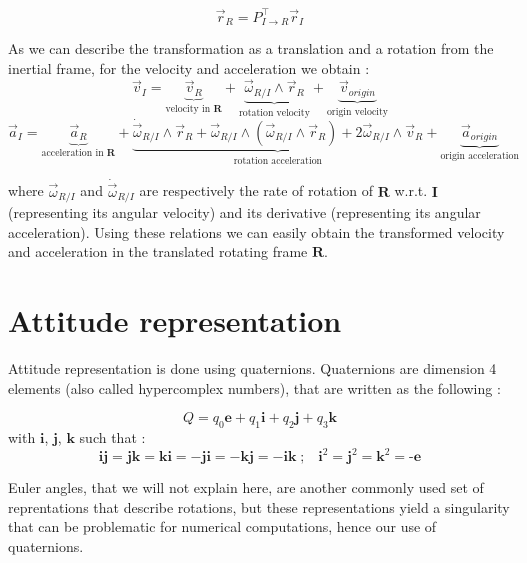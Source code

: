 \documentclass{article}
\begin{document}
\begin{equation}
\vec{r}_R = P^\top_{I \rightarrow R}\vec{r}_I
\end{equation}

As we can describe the transformation as a translation and a rotation from the inertial frame, for the velocity and acceleration we obtain \cite{book:911134}: \\

\begin{equation}
  \vec{v}_I = \underbrace{\vec{v}_R}_{\text{velocity in }\bm{R}} + \underbrace{\vec{\omega}_{R/I}\wedge \vec{r}_R}_{\text{rotation velocity}} + \underbrace{\vec{v}_{origin}}_{\text{origin velocity}}
\end{equation}
\begin{equation}
  \vec{a}_I = \underbrace{\vec{a}_R}_{\text{acceleration in }\bm{R}} + \underbrace{ \dot{\vec{\omega}}_{R/I}\wedge\vec{r}_R + \vec{\omega}_{R/I}\wedge \left( \vec{\omega}_{R/I}\wedge\vec{r}_R \right) + 2\vec{\omega}_{R/I}\wedge\vec{v}_R}_{\text{rotation acceleration}} + \underbrace{\vec{a}_{origin}}_{\text{origin acceleration}}
\end{equation}

where $\vec{\omega}_{R/I}$ and $\dot{\vec{\omega}}_{R/I}$ are respectively the rate of rotation of $\bm{R}$ w.r.t. $\bm{I}$ (representing its angular velocity) and its derivative (representing its angular acceleration). Using these relations we can easily obtain the transformed velocity and acceleration in the translated rotating frame $\bm{R}$.

\section{Attitude representation}

Attitude representation is done using quaternions. Quaternions are dimension 4 elements (also called hypercomplex numbers), that are written as the following \cite{QUA}:

\begin{equation} Q = q_0\textbf{e} + q_1\textbf{i} + q_2\textbf{j} + q_3\textbf{k}
\end{equation}
with $\textbf{i}$, $\textbf{j}$, $\textbf{k}$ such that :
\[ \textbf{i}\textbf{j} = \textbf{j}\textbf{k} = \textbf{k}\textbf{i} = -\textbf{j}\textbf{i} = -\textbf{k}\textbf{j} = - \textbf{i}\textbf{k} \; ; \; \; \; \textbf{i}^2 = \textbf{j}^2 = \textbf{k}^2 = \textbf{-e}
\]

Euler angles, that we will not explain here, are another commonly used set of reprentations that describe rotations, but these representations yield a singularity that can be problematic for numerical computations, hence our use of quaternions.
\end{document}
